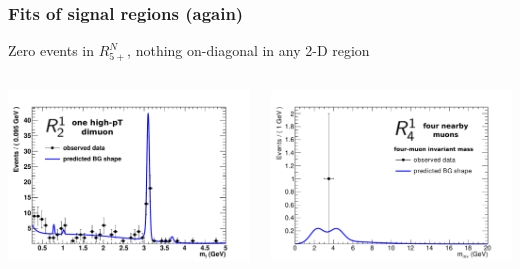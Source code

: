 \documentclass[compress]{beamer}
\begin{document}
\begin{frame}
\frametitle{Fits of signal regions (again)}

Zero events in $R^N_{5+}$, nothing on-diagonal in any 2-D region

\begin{columns}
\includegraphics[width=\linewidth]{signal_a1_data-bkgpdf2.pdf}

\includegraphics[width=\linewidth]{model_data_a2_m_inv_w22.pdf}
\end{columns}


\end{frame}
\end{document}
